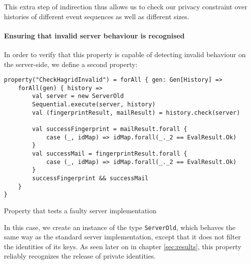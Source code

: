 This extra step of indirection thus allows us to check our privacy constraint over histories of different event sequences as well as different sizes.
\paragraph{Ensuring that invalid server behaviour is recognised}
In order to verify that this property is capable of detecting invalid behaviour on the server-side, we define a second property:
\begin{code}
    \begin{verbatim}
property("CheckHagridInvalid") = forAll { gen: Gen[History] =>
    forAll(gen) { history =>
        val server = new ServerOld
        Sequential.execute(server, history)
        val (fingerprintResult, mailResult) = history.check(server)

        val successFingerprint = mailResult.forall {
            case (_, idMap) => idMap.forall(_._2 == EvalResult.Ok)
        }
        val successMail = fingerprintResult.forall {
            case (_, idMap) => idMap.forall(_._2 == EvalResult.Ok)
        }
        successFingerprint && successMail
    }
}
    \end{verbatim}
    \caption{Property that tests a faulty server implementation}
\end{code}  

In this case, we create an instance of the type \texttt{ServerOld}, which behaves the same way as the standard server implementation, except that it does not filter the identities of its keys. As seen later on in chapter \ref{sec:results}, this property reliably recognizes the release of private identities.


